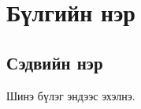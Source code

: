 
\chapter{Бүлгийн нэр} %
\label{Chapter3} %
\pagecolor{white}


\section{Сэдвийн нэр }

Шинэ бүлэг эндээс эхэлнэ.
